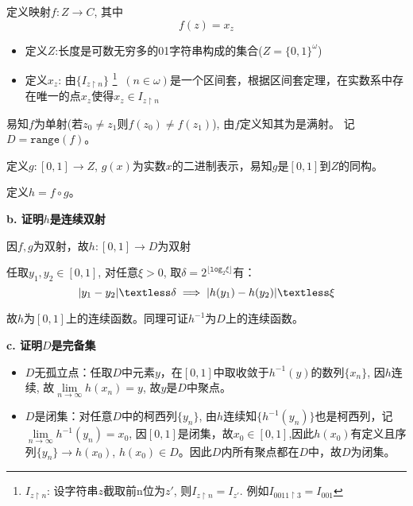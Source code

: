 \documentclass[UTF8, 9pt, a4paper]{ctexart}
\newcommand{\ksec}[2]{\noindent \textbf{\large #1} #2\par}
\begin{document}
	定义映射$ f:Z \rightarrow C $, 其中
		$$ f(z) = x_z $$
	\begin{itemize}
		\item 定义$ Z $:长度是可数无穷多的01字符串构成的集合($ Z = \{0,1\}^\omega $)
		\item 定义$ x_z $: 由$ \{ I_{z \upharpoonright n}\}$ \footnote{ $ I_{z\upharpoonright n} $: 设字符串$ z $截取前n位为$ z' $, 则$ I_{z \upharpoonright n} = I_{z'} $. 例如$ I_{ 0011 \upharpoonright 3} = I_{001} $} $ \ (n \in \omega) $是一个区间套，根据区间套定理，在实数系中存在唯一的点$ x_z $使得$ x_z \in I_{z \upharpoonright n} $
	\end{itemize}
	
	易知$ f $为单射(若$ z_0 \neq z_1 $则$ f(z_0) \neq f(z_1)$), 由$ f $定义知其为是满射。
	记$ D = \texttt{range}(f) $。
	
	定义$ g :[0,1] \rightarrow Z $, $ g(x) $为实数$ x $的二进制表示，易知$ g $是$ [0,1] $到$ Z $的同构。
	
	定义$ h = f \circ g $。

	\vspace{1cm}

	\indent \ksec{b. 证明$ h $是连续双射}{}
	因$ f, g $为双射，故$ h: [0,1] \rightarrow D $为双射
	
	任取$ y_1, y_2 \in [0,1] $, 对任意$ \xi > 0 $, 取$ \delta = 2^{ \lfloor \texttt{log}_2\xi \rfloor} $有：
	$$ |y_1 - y_2| \textless \delta \implies |h(y_1) - h(y_2)| \textless \xi $$
	
	故$ h $为$ [0,1] $上的连续函数。同理可证$ h^{-1} $为$ D $上的连续函数。

	\indent \ksec{c. 证明$ D $是完备集}{}
	
	\begin{itemize}
		\item $ D $无孤立点：任取$ D $中元素$ y $，在$ [0,1] $中取收敛于$ h^{-1}(y) $的数列$ \{x_n\} $, 因$ h $连续, 故$ \lim\limits_{n \rightarrow \infty} h(x_n) = y $, 故$ y $是$ D $中聚点。
		
		\item $ D $是闭集：对任意$ D $中的柯西列$ \{ y_n \} $, 由$ h $连续知$ \{h^{-1}(y_n)\} $也是柯西列，记$ \lim\limits_{n \rightarrow \infty}h^{-1}(y_n) = x_0 $, 因$ [0,1] $是闭集，故$ x_0 \in [0,1] $,因此$ h(x_0) $有定义且序列$\{y_n\} \rightarrow h(x_0) $, $ h(x_0) \in D $。因此$ D $内所有聚点都在$ D $中，故$ D $为闭集。
	\end{itemize}
	
\end{document}
